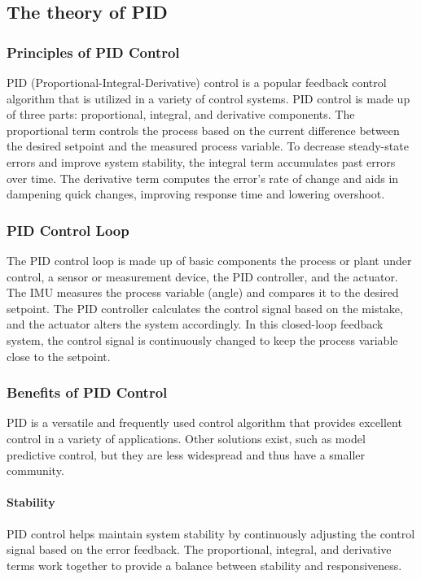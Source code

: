 \subsection{The theory of PID}

\subsubsection{Principles of PID Control}

PID (Proportional-Integral-Derivative) control is a popular feedback control algorithm that is utilized in a variety of control systems. PID control is made up of three parts: proportional, integral, and derivative components. The proportional term controls the process based on the current difference between the desired setpoint and the measured process variable. To decrease steady-state errors and improve system stability, the integral term accumulates past errors over time. The derivative term computes the error's rate of change and aids in dampening quick changes, improving response time and lowering overshoot. \cite{PIDbook}
\subsubsection{PID Control Loop}

The PID control loop is made up of basic components the process or plant under control, a sensor or measurement device, the PID controller, and the actuator. The IMU measures the process variable (angle) and compares it to the desired setpoint. The PID controller calculates the control signal based on the mistake, and the actuator alters the system accordingly. In this closed-loop feedback system, the control signal is continuously changed to keep the process variable close to the setpoint. \cite{PIDbook}
\subsubsection{Benefits of PID Control}

PID is a versatile and frequently used control algorithm that provides excellent control in a variety of applications. Other solutions exist, such as model predictive control, but they are less widespread and thus have a smaller community. \cite{Efheij2019}

\paragraph{Stability}PID control helps maintain system stability by continuously adjusting the control signal based on the error feedback. The proportional, integral, and derivative terms work together to provide a balance between stability and responsiveness. \cite{PIDbook}
